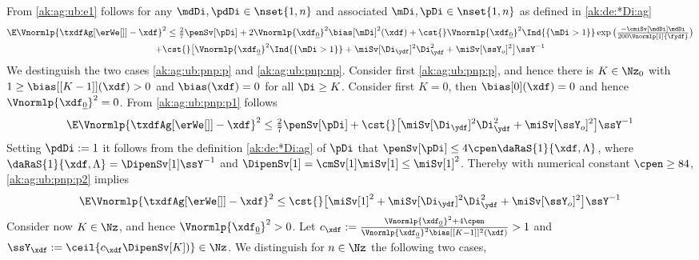 \begin{pro}
From
\eqref{ak:ag:ub:e1} follows for any $\mdDi,\pdDi\in\nset{1,n}$ and associated
$\mDi,\pDi\in\nset{1,n}$ as defined in  \eqref{ak:de:*Di:ag}%
 \begin{multline}\label{ak:ag:ub:pnp:p1}
     \E\Vnormlp{\txdfAg[{\erWe[]}]-\xdf}^2\leq \tfrac{2}{7}\penSv[\pDi]
    +2\Vnormlp{\xdf_{\underline{0}}}^2\bias[\mDi]^2(\xdf)
 + \cst{}\Vnormlp{\xdf_{\underline{0}}}^2\Ind{\{\mDi>1\}}\exp\big(\tfrac{-\cmiSv[\mdDi]\mdDi}{200\Vnormlp[1]{\fydf}}\big)\\
    +\cst{}\big[\Vnormlp{\xdf_{\underline{0}}}^2\Ind{\{\mDi>1\}}
+\miSv[\Di_{\ydf}]^2\Di_{\ydf}^2+\miSv[\ssY_{o}]^2 \big]\ssY^{-1}
\end{multline}
We destinguish the two cases \ref{ak:ag:ub:pnp:p} and
\ref{ak:ag:ub:pnp:np}. Consider first \ref{ak:ag:ub:pnp:p}, and hence there is $K\in\Nz_0$   with   $1\geq \bias[{[K-1] }](\xdf)>0$ and
$\bias(\xdf)=0$ for all $\Di\geq K$. Consider first $K=0$, then $\bias[0](\xdf)=0$
and hence $\Vnormlp{\xdf_{\underline{0}}}^2=0$. From \eqref{ak:ag:ub:pnp:p1}
follows 
 \begin{equation}\label{ak:ag:ub:pnp:p2}
     \E\Vnormlp{\txdfAg[{\erWe[]}]-\xdf}^2\leq \tfrac{2}{7}\penSv[\pDi]
    +\cst{}\big[\miSv[\Di_{\ydf}]^2\Di_{\ydf}^2+\miSv[\ssY_{o}]^2 \big]\ssY^{-1}
\end{equation}
Setting  $\pdDi:=1$ it follows from the definition
\eqref{ak:de:*Di:ag} of  $\pDi$ that
$\penSv[\pDi]\leq4\cpen\daRaS{1}{\xdf,\Lambda}$, where
$\daRaS{1}{\xdf,\Lambda}=\DipenSv[1]\ssY^{-1}$ and
$\DipenSv[1]=\cmSv[1] \miSv[1]\leq\miSv[1]^2$. Thereby with numerical
constant $\cpen\geq84$, \eqref{ak:ag:ub:pnp:p2} implies
 \begin{equation}\label{ak:ag:ub:pnp:p3}
     \E\Vnormlp{\txdfAg[{\erWe[]}]-\xdf}^2\leq\cst{}\big[\miSv[1]^2+\miSv[\Di_{\ydf}]^2\Di_{\ydf}^2+\miSv[\ssY_{o}]^2 \big]\ssY^{-1}
\end{equation}
Consider now $K\in\Nz$, and hence $\Vnormlp{\xdf_{\underline{0}}}^2>0$. Let 
$c_{\xdf}:=\tfrac{\Vnormlp{\xdf_{\underline{0}}}^2+4\cpen}{\Vnormlp{\xdf_{\underline{0}}}^2\bias[{[K-1]}]^2(\xdf)}>1$
and $\ssY_{\xdf}:=\ceil{c_{\xdf}\DipenSv[K])}\in\Nz$. We distinguish for $n\in\Nz$ the following two
 cases, \begin{inparaenum}[i]\renewcommand{\theenumi}{\dgrau\rm(\alph{enumi})}\item\label{ak:ag:ub:pnp:p:c1}

\end{inparaenum}
\end{pro}
